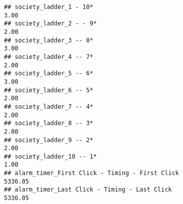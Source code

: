 \documentclass[
]{article}
\begin{document}
\begin{verbatim}
## society_ladder_1 - 10*                                                                                                                                                                                                         3.00
## society_ladder_2 - - 9*                                                                                                                                                                                                        2.00
## society_ladder_3 -- 8*                                                                                                                                                                                                         3.00
## society_ladder_4 -- 7*                                                                                                                                                                                                         2.00
## society_ladder_5 -- 6*                                                                                                                                                                                                         3.00
## society_ladder_6 -- 5*                                                                                                                                                                                                         2.00
## society_ladder_7 -- 4*                                                                                                                                                                                                         2.00
## society_ladder_8 -- 3*                                                                                                                                                                                                         2.00
## society_ladder_9 -- 2*                                                                                                                                                                                                         2.00
## society_ladder_10 -- 1*                                                                                                                                                                                                        1.00
## alarm_timer_First Click - Timing - First Click                                                                                                                                                                              5336.05
## alarm_timer_Last Click - Timing - Last Click                                                                                                                                                                                5336.05

\end{verbatim}
\end{document}
